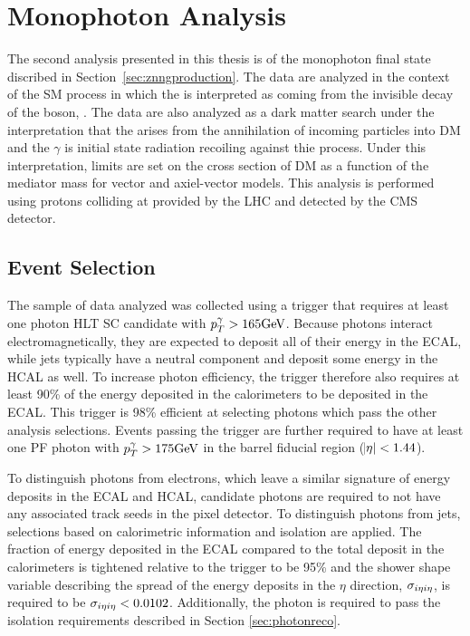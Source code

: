 
\chapter{Monophoton Analysis}\label{sec:lgxc}

 The second analysis presented in this thesis
  is of the monophoton final state discribed 
  in Section~\ref{sec:znngproduction}.
The data are analyzed in the context of the 
 SM process \ppzgnng  in which the \met is interpreted as coming from the
 invisible decay of the \z boson, \znn.
The data are also analyzed
 as a dark matter search under the interpretation 
 that the \met arises from the 
 annihilation of incoming particles into DM 
 and the $\gamma$ is initial state radiation 
 recoiling against thie process. 
Under this interpretation, limits are set on the
 cross section of DM as a function of the 
 mediator mass for vector and axiel-vector models. 
This analysis is performed using protons colliding at
  \TeV provided by the LHC and detected by
 the CMS detector.

\section{Event Selection}\label{subsec:lgevent_selection}

The sample of data analyzed was collected using 
 a trigger that requires at least one photon
 HLT SC candidate with $p_T^\gamma > 165 \mathrm{GeV}$.
Because photons interact electromagnetically, they 
 are expected to deposit all of their energy in the
 ECAL, while jets typically have a neutral component and 
 deposit some energy in the HCAL as well. 
To increase photon efficiency, the trigger therefore also
 requires at least 90\% of the energy deposited in 
 the calorimeters to be deposited in the ECAL.
This trigger is 98\% efficient at selecting photons
 which pass the other analysis selections.
Events passing the trigger are further required to
 have at least one PF photon with $p_T^\gamma > 175\mathrm{GeV}$
 in the barrel fiducial region ($\abs{\eta} < 1.44$).

To distinguish photons from electrons, which leave a similar
 signature of energy deposits in the ECAL and HCAL,
 candidate photons are required
 to not have any associated track seeds in the pixel detector. 
To distinguish photons from jets, selections based on calorimetric
 information and isolation are applied. 
The fraction of energy deposited in the ECAL compared 
 to the total deposit in the calorimeters
 is tightened relative to the trigger to be 95\%
 and the shower shape variable describing the spread
 of the energy deposits in the $\eta$ direction,
  $\sigma_{i\eta i\eta}$, %
 is required to be $\sigma_{i\eta i\eta} < 0.0102$. 
Additionally, the photon is required to pass
 the isolation requirements described in Section \ref{sec:photonreco}.

